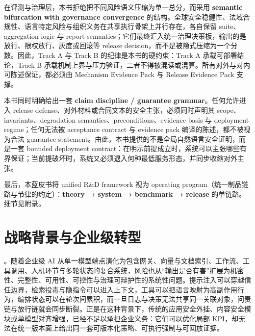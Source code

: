 \documentclass[11pt,a4paper]{report}
\begin{document}
{在评测与治理层，本书拒绝把不同风险语义压缩为单一总分，而采用 \textbf{semantic bifurcation with governance convergence} 的结构。全球安全稳健性、法域合规性、语言特定风险与组织义务在共享执行骨架上并行存在，各自保留 suite、aggregation logic 与 report semantics；它们最终汇入统一治理决策板，输出的是放行、限权放行、灰度或回滚等 release decision，而不是被隐式压缩为一个分数。因此，Track A 与 Track B 的纪律是本书的硬约束：Track A 承载可部署结论，Track B 承载机制上界与压力验证，二者不得被混读或混算。所有对外与对内可陈述保证，都必须由 Mechanism Evidence Pack 与 Release Evidence Pack 支撑。

本书同时明确给出一套 \textbf{claim discipline / guarantee grammar}。任何允许进入 release defense、对外材料或合同文本的安全主张，必须同时声明其 scope、invariants、degradation semantics、preconditions、evidence basis 与 deployment regime；任何无法被 acceptance contract 与 evidence pack 编译的陈述，都不被视为合法 guarantee statement。由此，本书提供的不是全局自然语言安全证明，而是一套 bounded deployment contract：在明示前提成立时，系统可以主张哪些有界保证；当前提破坏时，系统又必须退入何种最低服务形态，并同步收缩对外主张。

最后，本蓝皮书将 unified R\&D framework 视为 operating program（统一制品链路与节律的约定）：\textbf{theory → system → benchmark → release} 的单链路。细节见附录。
}


\section{战略背景与企业级转型}
\ControlPlane{}。随着企业级 AI 从单一模型端点演化为包含网关、向量与文档索引、工作流、工具调用、人机环节与多轮状态的复合系统，风险也从“输出是否有害”扩展为机密性、完整性、可用性、可控性与治理可辩护性的系统性问题。提示注入可以穿越信任边界，检索投毒与隐指令可以进入上下文，工具可以把语言映射为高副作用行为，编排状态可以在轮次间累积，而一旦日志与决策无法共享同一关联对象，问责链与放行链就会同步断裂。正是在这种背景下，传统的应用安全外挂、内容安全模块或单模型对齐增强，已经不足以承担企业义务：它们可以优化局部 KPI，却无法在统一版本面上给出同一套可版本化策略、可执行强制与可回放证据。
\end{document}
